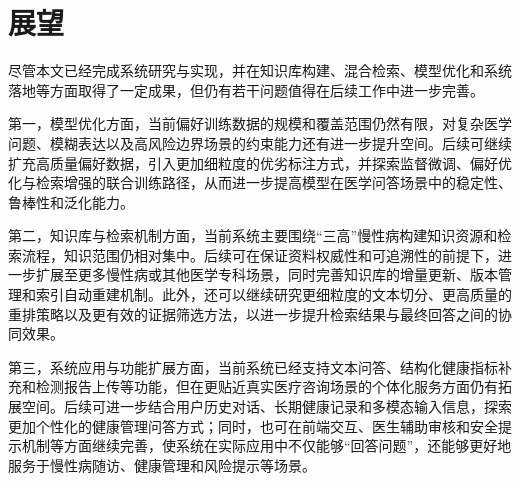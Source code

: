 \section{展望}

尽管本文已经完成系统研究与实现，并在知识库构建、混合检索、模型优化和系统落地等方面取得了一定成果，但仍有若干问题值得在后续工作中进一步完善。

第一，模型优化方面，当前偏好训练数据的规模和覆盖范围仍然有限，对复杂医学问题、模糊表达以及高风险边界场景的约束能力还有进一步提升空间。后续可继续扩充高质量偏好数据，引入更加细粒度的优劣标注方式，并探索监督微调、偏好优化与检索增强的联合训练路径，从而进一步提高模型在医学问答场景中的稳定性、鲁棒性和泛化能力。

第二，知识库与检索机制方面，当前系统主要围绕“三高”慢性病构建知识资源和检索流程，知识范围仍相对集中。后续可在保证资料权威性和可追溯性的前提下，进一步扩展至更多慢性病或其他医学专科场景，同时完善知识库的增量更新、版本管理和索引自动重建机制。此外，还可以继续研究更细粒度的文本切分、更高质量的重排策略以及更有效的证据筛选方法，以进一步提升检索结果与最终回答之间的协同效果。

第三，系统应用与功能扩展方面，当前系统已经支持文本问答、结构化健康指标补充和检测报告上传等功能，但在更贴近真实医疗咨询场景的个体化服务方面仍有拓展空间。后续可进一步结合用户历史对话、长期健康记录和多模态输入信息，探索更加个性化的健康管理问答方式；同时，也可在前端交互、医生辅助审核和安全提示机制等方面继续完善，使系统在实际应用中不仅能够“回答问题”，还能够更好地服务于慢性病随访、健康管理和风险提示等场景。

